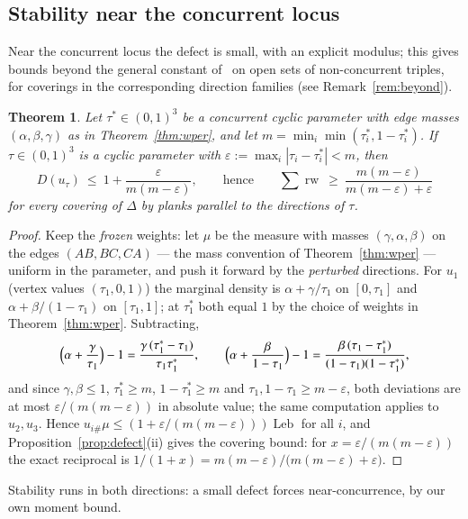 \documentclass{aims}
\numberwithin{equation}{section}
\theoremstyle{plain}
\newtheorem{theorem}{Theorem}[section]
\theoremstyle{definition}
\theoremstyle{remark}
\newcommand{\rw}{\operatorname{rw}}
\newcommand{\Leb}{\operatorname{Leb}}
\begin{document}
\subsection*{Stability near the concurrent locus}
Near the concurrent locus the defect is small, with an explicit modulus; this
gives bounds beyond the general constant of~\cite{BY26} on open sets of
non-concurrent triples, for coverings in the corresponding direction families
(see Remark~\ref{rem:beyond}).

\begin{theorem}\label{thm:defectstab}
Let $\tau^*\in(0,1)^3$ be a concurrent cyclic parameter with edge masses
$(\alpha,\beta,\gamma)$ as in Theorem~\ref{thm:wper}, and let
$m=\min_i\min(\tau_i^*,1-\tau_i^*)$. If $\tau\in(0,1)^3$ is a cyclic parameter
with $\varepsilon:=\max_i|\tau_i-\tau_i^*|<m$, then
\[
D(u_\tau)\ \le\ 1+\frac{\varepsilon}{m(m-\varepsilon)},
\qquad\text{hence}\qquad
\sum\rw\ \ge\ \frac{m(m-\varepsilon)}{m(m-\varepsilon)+\varepsilon}
\]
for every covering of $\Delta$ by planks parallel to the directions of $\tau$.
\end{theorem}

\begin{proof}
Keep the \emph{frozen} weights: let $\mu$ be the measure with masses
$(\gamma,\alpha,\beta)$ on the edges $(AB,BC,CA)$ --- the mass convention of
Theorem~\ref{thm:wper} --- uniform in the parameter, and
push it forward by the \emph{perturbed} directions. For $u_1$ (vertex values
$(\tau_1,0,1)$) the marginal density is $\alpha+\gamma/\tau_1$ on $[0,\tau_1]$
and $\alpha+\beta/(1-\tau_1)$ on $[\tau_1,1]$; at $\tau_1^*$ both equal $1$ by
the choice of weights in Theorem~\ref{thm:wper}. Subtracting,
\[
\Bigl(\alpha+\frac{\gamma}{\tau_1}\Bigr)-1
=\frac{\gamma\,(\tau_1^*-\tau_1)}{\tau_1\tau_1^*},\qquad
\Bigl(\alpha+\frac{\beta}{1-\tau_1}\Bigr)-1
=\frac{\beta\,(\tau_1-\tau_1^*)}{(1-\tau_1)(1-\tau_1^*)},
\]
and since $\gamma,\beta\le1$, $\tau_1^*\ge m$, $1-\tau_1^*\ge m$ and
$\tau_1,1-\tau_1\ge m-\varepsilon$, both deviations are at most
$\varepsilon/(m(m-\varepsilon))$ in absolute value; the same computation applies
to $u_2,u_3$. Hence $u_{i\#}\mu\le(1+\varepsilon/(m(m-\varepsilon)))\Leb$ for
all $i$, and Proposition~\ref{prop:defect}(ii) gives the covering bound: for
$x=\varepsilon/(m(m-\varepsilon))$ the exact reciprocal is
$1/(1+x)=m(m-\varepsilon)/\bigl(m(m-\varepsilon)+\varepsilon\bigr)$.
\end{proof}

Stability runs in both directions: a small defect forces near-concurrence,
by our own moment bound.
\end{document}
